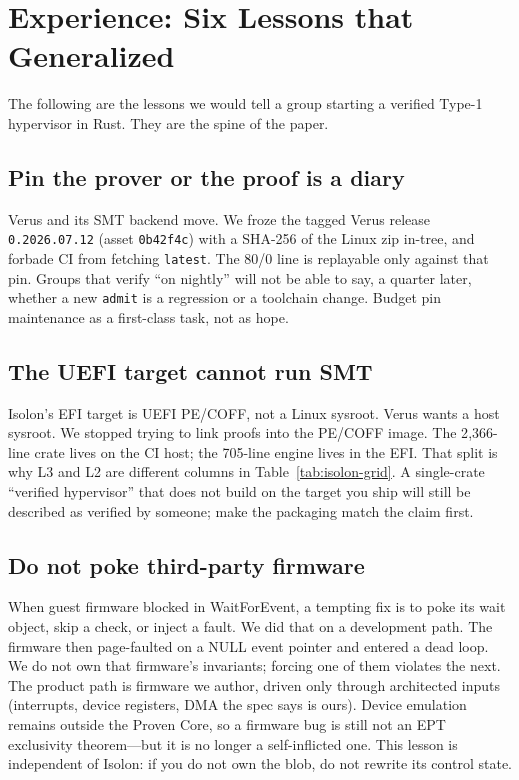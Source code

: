 \documentclass[sigplan,10pt,anonymous]{acmart}
\begin{document}
\section{Experience: Six Lessons that Generalized}
\label{sec:lessons}

The following are the lessons we would tell a group starting a verified
Type-1 hypervisor in Rust. They are the spine of the paper.

\subsection{Pin the prover or the proof is a diary}

Verus and its SMT backend move. We froze the tagged Verus release
\texttt{0.2026.07.12} (asset \texttt{0b42f4c}) with a SHA-256 of the Linux zip
in-tree, and forbade CI from fetching \texttt{latest}. The 80/0 line is replayable
only against that pin. Groups that verify ``on nightly'' will not be able
to say, a quarter later, whether a new \texttt{admit} is a regression or a
toolchain change. Budget pin maintenance as a first-class task, not as
hope.

\subsection{The UEFI target cannot run SMT}

Isolon's EFI target is UEFI PE/COFF, not a Linux sysroot. Verus wants a host
sysroot. We stopped trying to link proofs into the PE/COFF image. The
2{,}366-line crate lives on the CI host; the 705-line engine lives in the
EFI. That split is why L3 and L2 are different columns in
Table~\ref{tab:isolon-grid}. A single-crate ``verified hypervisor'' that does
not build on the target you ship will still be described as verified by
someone; make the packaging match the claim first.

\subsection{Do not poke third-party firmware}
\label{sec:nofirmwarepoke}

When guest firmware blocked in WaitForEvent, a tempting fix is to poke
its wait object, skip a check, or inject a fault. We did that on a
development path. The firmware then page-faulted on a NULL event
pointer and entered a dead loop. We do not own
that firmware's invariants; forcing one of them violates the next. The
product path is firmware we author, driven only through architected
inputs (interrupts, device registers, DMA the spec says is ours). Device
emulation remains outside the Proven Core, so a firmware bug is still
not an EPT exclusivity theorem---but it is no longer a self-inflicted
one. This lesson is independent of Isolon: if you do not own the blob,
do not rewrite its control state.
\end{document}
